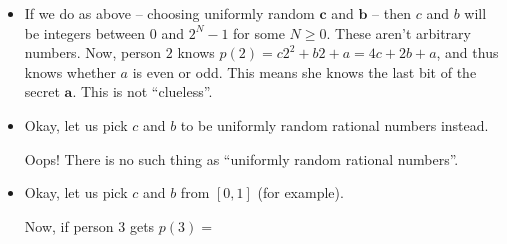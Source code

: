 \documentclass[numbers=enddot,12pt,final,onecolumn,notitlepage]{scrartcl}%
\numberwithin{exer}{section}
\theoremstyle{definition}
\begin{document}
\begin{itemize}
\item If we do as above -- choosing uniformly random $\mathbf{c}$ and
$\mathbf{b}$ -- then $c$ and $b$ will be integers between $0$ and $2^{N}-1$
for some $N\geq0$. These aren't arbitrary numbers. Now, person $2$ knows
$p\left(  2\right)  =c2^{2}+b2+a=4c+2b+a$, and thus knows whether $a$ is even
or odd. This means she knows the last bit of the secret $\mathbf{a}$. This is
not \textquotedblleft clueless\textquotedblright.

\item Okay, let us pick $c$ and $b$ to be uniformly random rational numbers instead.

Oops! There is no such thing as \textquotedblleft uniformly random rational
numbers\textquotedblright.

\item Okay, let us pick $c$ and $b$ from $\left[  0,1\right]  $ (for example).

Now, if person $3$ gets $p\left(  3\right)  =$
\end{itemize}
\end{document}
